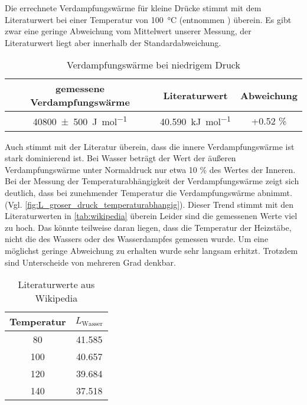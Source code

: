 Die errechnete Verdampfungswärme für kleine Drücke stimmt mit dem Literaturwert bei einer Temperatur von \SI{100}{\celsius} (entnommen \cite[Kapitel~5.6.1: Koexistenz von Flüssigkeit und Dampf]{Gerthsen}) überein. Es gibt zwar eine geringe Abweichung vom Mittelwert unserer Messung, der Literaturwert liegt aber innerhalb der Standardabweichung.
\begin{table}[h!]
\begin{center}
	\begin{tabular}{c|c|c}
		gemessene Verdampfungswärme & Literaturwert &  Abweichung \\ 
		\hline
		\SI{40800(500)}{\joule\per\mol} & \SI{40.590}{\kilo\joule\per\mol} & +0.52 \%
	\end{tabular}
	\caption{Verdampfungswärme bei niedrigem Druck}	
\end{center}
\end{table}

Auch stimmt mit der Literatur überein, dass die innere Verdampfungswärme ist stark dominierend ist. Bei Wasser beträgt der Wert der äußeren Verdampfungswärme unter Normaldruck nur etwa 10 \% des Wertes der Inneren. \cite{TUGraz} \\

Bei der Messung der Temperaturabhängigkeit der Verdampfungswärme zeigt sich deutlich, dass bei zunehmender Temperatur die Verdampfungswärme abnimmt. (Vgl. \ref{fig:L_groser_druck_temperaturabhangig}). Dieser Trend  stimmt mit den Literaturwerten in \ref{tab:wikipedia} überein Leider sind die gemessenen Werte viel zu hoch. Das könnte teilweise daran liegen, dass die Temperatur der Heizstäbe, nicht die des Wassers oder des Wasserdampfes gemessen wurde. Um eine möglichst geringe Abweichung zu erhalten wurde sehr langsam erhitzt. Trotzdem sind Unterscheide von mehreren Grad denkbar.


\begin{table}[h!]
\begin{center}
\begin{tabular}{c | c}
	Temperatur & $L_\text{Wasser}$ \\
	\hline
	80 & 41.585 \\
	100 & 40.657 \\
	120 & 39.684 \\
	140 & 37.518
\end{tabular}
\end{center}
\caption{Literaturwerte aus Wikipedia}
\label{tab: wikipedia}
\end{table}